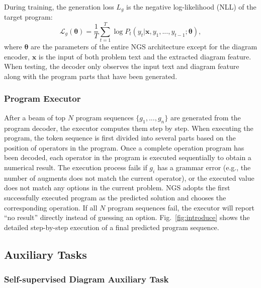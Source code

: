 \documentclass[11pt,a4paper]{article}
\begin{document}
During training, the generation loss $L_g$ is the negative log-likelihood (NLL) of the target program:
{
\setlength\abovedisplayskip{0.45pt}
\setlength\belowdisplayskip{0.55pt}
\begin{equation*}
\mathcal L_g(\bm \theta)=\frac{1}{T}\sum_{t=1}^T \log P_t(y_t|\bm x, y_1, ..., y_{t-1};\bm \theta),
\end{equation*}
}where $\bm \theta$ are the parameters of the entire NGS architecture except for the diagram encoder, $\bm x$ is the input of both problem text and the extracted diagram feature. When testing, the decoder only observes the input text and diagram feature along with the program parts that have been generated.

\subsubsection{Program Executor}

After a beam of top $N$ program sequences $\{g_1,...,g_n\}$ are generated from the program decoder, the executor computes them step by step. When executing the program, the token sequence is first divided into several parts based on the position of operators in the program. Once a complete operation program has been decoded, each operator in the program is executed sequentially to obtain a numerical result. The execution process fails if $g_i$ has a grammar error (e.g., the number of augments does not match the current operator), or the executed value does not match any options in the current problem. NGS adopts the first successfully executed program as the predicted solution and chooses the corresponding operation. If all $N$ program sequences fail, the executor will report ``no result'' directly instead of guessing an option. Fig.~\ref{fig:introduce} shows the detailed step-by-step execution of a final predicted program sequence.

















\subsection{Auxiliary Tasks}
\subsubsection{Self-supervised Diagram Auxiliary Task}
\end{document}
